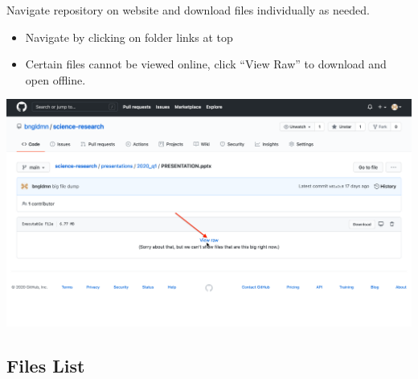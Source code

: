 \documentclass[11pt]{article}
\begin{document}
Navigate repository on website and download files individually as needed.

\begin{itemize}
\item Navigate by clicking on folder links at top
\item Certain files cannot be viewed online, click ``View Raw'' to download and open offline.
\end{itemize}

\begin{center}
\includegraphics[width=.9\linewidth]{./readme_imgs/viewraw.png}
\end{center}

\subsection{Files List}
\label{sec:org8e1f13a}
\end{document}
